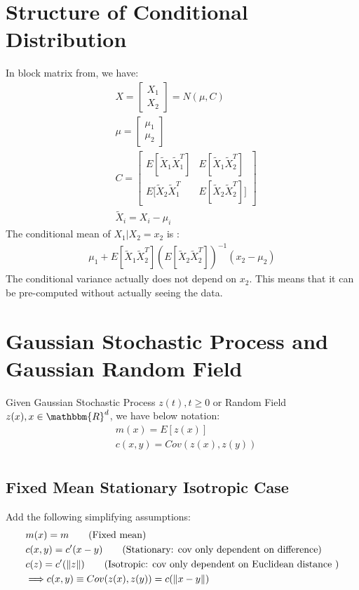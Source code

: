 \section{Structure of Conditional Distribution}
In block matrix from, we have: 
    \begin{align*}
        & X = \begin{bmatrix} X_1 \\ X_2\end{bmatrix} =  N(\mu, C) \\
        & \mu = \begin{bmatrix} \mu_1 \\ \mu_2\end{bmatrix}\\
        & C = \begin{bmatrix} E[\tilde{X}_1 \tilde{X}_1^T] &  E[\tilde{X}_1 \tilde{X}_2^T] \\ E[\tilde{X}_2 \tilde{X}_1^T & E[\tilde{X}_2 \tilde{X}_2^T]] \end{bmatrix} \\
        & \tilde{X}_i = X_i - \mu_i
    \end{align*}
The conditional mean of $X_1 | X_2 = x_2$ is :
    \begin{align*}
        \mu_1 + E[\tilde{X}_1\tilde{X}_2^T](E[\tilde{X}_2\tilde{X}_2^T])^{-1}(x_2 - \mu_2)
    \end{align*}
The conditional variance actually does not depend on $x_2$. This means that it can be pre-computed without actually seeing the data. 

\section{Gaussian Stochastic Process and Gaussian Random Field} 
Given Gaussian Stochastic Process $z(t), t \geq 0$ or Random Field $z(x), x\in \mathbbm{R}^d$, we have below notation: 
    \begin{align*}
        & m(x) = E[z(x)] \\
        & c(x,y) = Cov(z(x), z(y)) \\
    \end{align*}

\subsection{Fixed Mean Stationary Isotropic Case} 
Add the following simplifying assumptions: 
    \begin{align*}
        & m(x) = m \tag{Fixed mean} \\
        & c(x,y) = c'(x-y) \tag{Stationary: cov only dependent on difference} \\
        & c(z) = c'(\left\lVert z\right\rVert) \tag{Isotropic: cov only dependent on Euclidean distance } \\
        & \Longrightarrow c(x,y) \equiv Cov(z(x), z(y)) = c(\left\lVert x-y\right\rVert)
    \end{align*}
    

